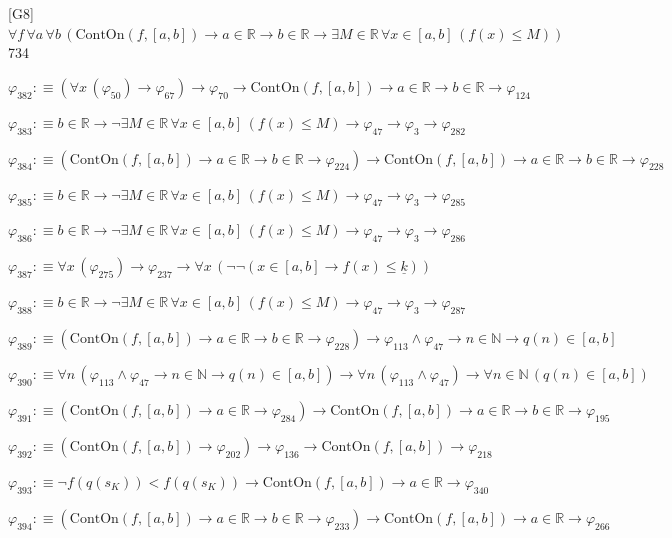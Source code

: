 \begin{fullproof}{[G8]}{$\forall f\,\forall a\,\forall b\,(\mathrm{ContOn}(f,[a,b]) \to a \in \mathbb{R} \to b \in \mathbb{R} \to \exists M \in \mathbb{R}\,\forall x \in [a,b]\,(f(x) \leq M))$}{734}
\begin{abbrevlist}
\item $\varphi_{382} :\equiv (\forall x\,(\varphi_{50}) \to \varphi_{67}) \to \varphi_{70} \to \mathrm{ContOn}(f,[a,b]) \to a \in \mathbb{R} \to b \in \mathbb{R} \to \varphi_{124}$
\item $\varphi_{383} :\equiv b \in \mathbb{R} \to \neg \exists M \in \mathbb{R}\,\forall x \in [a,b]\,(f(x) \leq M) \to \varphi_{47} \to \varphi_{3} \to \varphi_{282}$
\item $\varphi_{384} :\equiv (\mathrm{ContOn}(f,[a,b]) \to a \in \mathbb{R} \to b \in \mathbb{R} \to \varphi_{224}) \to \mathrm{ContOn}(f,[a,b]) \to a \in \mathbb{R} \to b \in \mathbb{R} \to \varphi_{228}$
\item $\varphi_{385} :\equiv b \in \mathbb{R} \to \neg \exists M \in \mathbb{R}\,\forall x \in [a,b]\,(f(x) \leq M) \to \varphi_{47} \to \varphi_{3} \to \varphi_{285}$
\item $\varphi_{386} :\equiv b \in \mathbb{R} \to \neg \exists M \in \mathbb{R}\,\forall x \in [a,b]\,(f(x) \leq M) \to \varphi_{47} \to \varphi_{3} \to \varphi_{286}$
\item $\varphi_{387} :\equiv \forall x\,(\varphi_{275}) \to \varphi_{237} \to \forall x\,(\neg \neg (x \in [a,b] \to f(x) \leq \underline{k}))$
\item $\varphi_{388} :\equiv b \in \mathbb{R} \to \neg \exists M \in \mathbb{R}\,\forall x \in [a,b]\,(f(x) \leq M) \to \varphi_{47} \to \varphi_{3} \to \varphi_{287}$
\item $\varphi_{389} :\equiv (\mathrm{ContOn}(f,[a,b]) \to a \in \mathbb{R} \to b \in \mathbb{R} \to \varphi_{228}) \to \varphi_{113} \land \varphi_{47} \to n \in \mathbb{N} \to q(n) \in [a,b]$
\item $\varphi_{390} :\equiv \forall n\,(\varphi_{113} \land \varphi_{47} \to n \in \mathbb{N} \to q(n) \in [a,b]) \to \forall n\,(\varphi_{113} \land \varphi_{47}) \to \forall n \in \mathbb{N}\,(q(n) \in [a,b])$
\item $\varphi_{391} :\equiv (\mathrm{ContOn}(f,[a,b]) \to a \in \mathbb{R} \to \varphi_{284}) \to \mathrm{ContOn}(f,[a,b]) \to a \in \mathbb{R} \to b \in \mathbb{R} \to \varphi_{195}$
\item $\varphi_{392} :\equiv (\mathrm{ContOn}(f,[a,b]) \to \varphi_{202}) \to \varphi_{136} \to \mathrm{ContOn}(f,[a,b]) \to \varphi_{218}$
\item $\varphi_{393} :\equiv \neg f(q(s_{K})) < f(q(s_{K})) \to \mathrm{ContOn}(f,[a,b]) \to a \in \mathbb{R} \to \varphi_{340}$
\item $\varphi_{394} :\equiv (\mathrm{ContOn}(f,[a,b]) \to a \in \mathbb{R} \to b \in \mathbb{R} \to \varphi_{233}) \to \mathrm{ContOn}(f,[a,b]) \to a \in \mathbb{R} \to \varphi_{266}$

\end{abbrevlist}
\end{fullproof}
